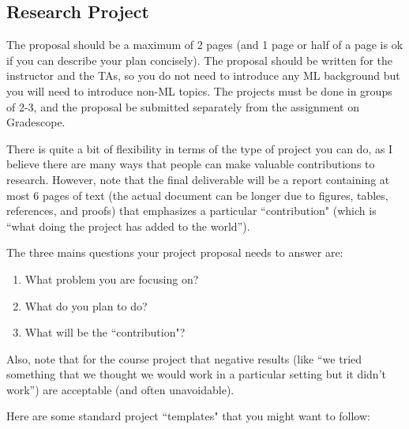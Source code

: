 \documentclass{article}
\def\blu#1{{\color{blu}#1}}
\begin{document}
\subsection*{Research Project}

The proposal should be a \blu{maximum of 2 pages} (and 1 page or half of a page is ok if you can describe your plan concisely). The proposal should be written for the instructor and the TAs, so you do not need to introduce any ML background but you will need to introduce non-ML topics. The projects \blu{must be done in groups of 2-3}, and the \blu{proposal be submitted separately from the assignment} on Gradescope.

There is quite a bit of flexibility in terms of the type of project you can do, as I believe there are many ways that people can make valuable contributions to research. However, note that the final deliverable will be a report containing at most 6 pages of text (the actual document can be longer due to figures, tables, references, and proofs) that emphasizes a particular ``contribution" (which is ``what doing the project has added to the world'').

\blu{The three mains questions your project proposal needs to answer are:
\begin{enumerate}
\item What problem you are focusing on?
\item What do you plan to do?
\item What will be the ``contribution"?
\end{enumerate}
}
Also, note that for the course project that negative results (like ``we tried something that we thought we would work in a particular setting but it didn't work'') are acceptable (and often unavoidable).

Here are some standard project ``templates" that you might want to follow:
\end{document}
